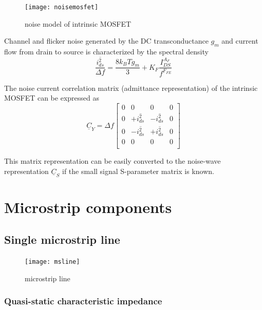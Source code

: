 \documentclass[10pt]{report}
\begin{document}
\begin{figure}[ht]
\begin{center}
\texttt{[image: noisemosfet]}
\end{center}
\caption{noise model of intrinsic MOSFET}
\label{fig:noisemosfet}
\end{figure}
\FloatBarrier

Channel and flicker noise generated by the DC transconductance $g_m$
and current flow from drain to source is characterized by the spectral
density
\begin{equation}
\dfrac{\overline{i_{ds}^2}}{\Delta f} = \dfrac{8 k_B T g_m}{3} + K_F\dfrac{I_{DS}^{A_F}}{f^{F_{FE}}}
\end{equation}

The noise current correlation matrix (admittance representation) of
the intrinsic MOSFET can be expressed as
\begin{equation}
\underline{C}_Y = \Delta f
\begin{bmatrix}
0 & 0 & 0 & 0\\
0 & +\overline{i_{ds}^2} & -\overline{i_{ds}^2} & 0\\
0 & -\overline{i_{ds}^2} & +\overline{i_{ds}^2} & 0\\
0 & 0 & 0 & 0\\
\end{bmatrix}
\end{equation}

This matrix representation can be easily converted to the noise-wave
representation $\underline{C}_S$ if the small signal S-parameter
matrix is known.

\chapter{Microstrip components}

\section{Single microstrip line}

\begin{figure}[ht]
\begin{center}
\texttt{[image: msline]}
\end{center}
\caption{microstrip line}
\label{fig:MSline}
\end{figure}
\FloatBarrier

\subsection{Quasi-static characteristic impedance}
\end{document}
